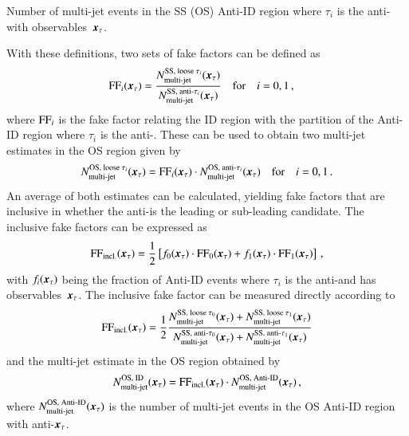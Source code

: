 {\begin{description}[style=standard]
  \item[$\NmjAntiID{SS(OS)}{i}\ffargs$] Number of multi-jet events in
    the SS (OS) Anti-ID region where $\tau_i$ is the anti-\tauhadvis
    with observables~$\myvec{x}_\tau$.
  \end{description}
  With these definitions, two sets of fake factors can be defined as
  \begin{align*}
    \FF_{i}\ffargs &= \frac{\NmjID{SS}{i} \ffargs}{\NmjAntiID{SS}{i}\ffargs}
                     \quad \text{for} \quad i = 0, 1 \,\text{,}
  \end{align*}
  where $\text{FF}_{i}$ is the fake factor relating the ID region with the
  partition of the Anti-ID region where $\tau_i$ is the
  anti-\tauhadvis. These can be used to obtain two multi-jet estimates
  in the OS region given by
  \begin{align*}
    \NmjID{OS}{i}\ffargs = \FF_{i}\ffargs \cdot \NmjAntiID{OS}{i}\ffargs
    \quad \text{for} \quad i = 0, 1 \,\text{.}
  \end{align*}
  An average of both estimates can be calculated, yielding fake
  factors that are inclusive in whether the anti-\tauhadvis is the
  leading or sub-leading \tauhadvis candidate. The inclusive fake
  factors can be expressed as
  \begin{align*}
    \FF_\text{incl.}\ffargs = \frac{1}{2} \left[ f_0\ffargs \cdot \FF_0\ffargs
    + f_1\ffargs \cdot \FF_1\ffargs \right] \,\text{,}
  \end{align*}
  with $f_i\ffargs$ being the fraction of Anti-ID events where
  $\tau_i$ is the anti-\tauhadvis and has
  observables~$\myvec{x}_\tau$. The inclusive fake factor can be
  measured directly according to
  \begin{align}
    \FF_\text{incl.}\ffargs
    = \frac{1}{2} \frac{ \NmjID{SS}{0}\ffargs + \NmjID{SS}{1}\ffargs }
                       { \NmjAntiID{SS}{0}\ffargs + \NmjAntiID{SS}{1}\ffargs }
    \label{eq:inclusive_fake_factor}
  \end{align}
  and the multi-jet estimate in the OS region obtained by
  \begin{align*}
    \NmjIDIncl{OS}\ffargs = \FF_\text{incl.}\ffargs \cdot \NmjAntiIDIncl{OS}\ffargs \,\text{,}
  \end{align*}
  where $\NmjAntiIDIncl{OS}\ffargs$ is the number of multi-jet events
  in the OS Anti-ID region with anti-\tauhadvis $\myvec{x}_\tau$.


}
